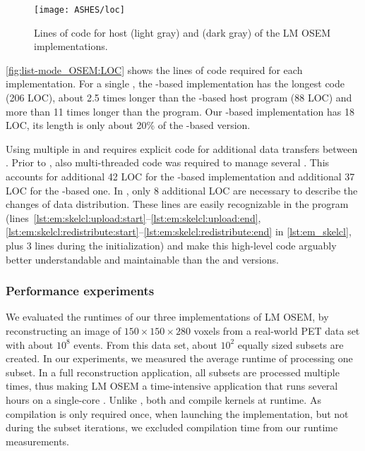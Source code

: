 \begin{figure}
  \centering
  \texttt{[image: ASHES/loc]}
  \caption{Lines of code for host (light gray) and \GPU (dark gray) of the LM OSEM implementations.}
  \label{fig:list-mode_OSEM:LOC}
\end{figure}

\autoref{fig:list-mode_OSEM:LOC} shows the lines of code required for each implementation.
For a single \GPU, the \OpenCL-based implementation has the longest code (206 LOC), \ie about 2.5 times longer than the \CUDA-based host program (88 LOC) and more than 11 times longer than the \SkelCL program.
Our \SkelCL-based implementation has 18 LOC, \ie its length is only about 20\% of the \CUDA-based version.

Using multiple \GPUs in \OpenCL and \CUDA requires explicit code for additional data transfers between \GPUs.
Prior to , also multi-threaded code was required to manage several \GPUs.
This accounts for additional 42 LOC for the \CUDA-based implementation and additional 37 LOC for the \OpenCL-based one.
In \SkelCL, only 8 additional LOC are necessary to describe the changes of data distribution.
These lines are easily recognizable in the \SkelCL program (lines~\ref{lst:em:skelcl:upload:start}--\ref{lst:em:skelcl:upload:end}, \ref{lst:em:skelcl:redistribute:start}--\ref{lst:em:skelcl:redistribute:end} in \autoref{lst:em_skelcl}, plus 3 lines during the initialization) and make this high-level code arguably better understandable and maintainable than the \CUDA and \OpenCL versions.













\subsubsection*{Performance experiments}
We evaluated the runtimes of our three implementations of LM OSEM, by reconstructing an image of $150\times 150\times 280$ voxels from a real-world PET data set with about $10^8$ events.
From this data set, about $10^2$ equally sized subsets are created.
In our experiments, we measured the average runtime of processing one subset.
In a full reconstruction application, all subsets are processed multiple times, thus making LM OSEM a time-intensive application that runs several hours on a single-core \CPU.
Unlike \CUDA, both \OpenCL and \SkelCL compile kernels at runtime.
As compilation is only required once, when launching the implementation, but not during the subset iterations, we excluded compilation time from our runtime measurements.

